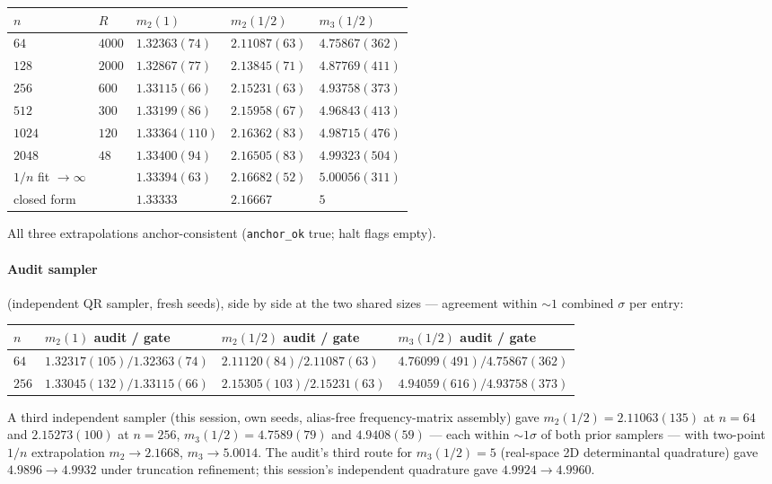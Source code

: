 \documentclass[11pt]{article}
\theoremstyle{plain}
\theoremstyle{definition}
\theoremstyle{remark}
\begin{document}
\begin{table}[h]
\centering
\begin{tabular}{@{}lllll@{}}
\toprule
$n$ & $R$ & $m_2(1)$ & $m_2(1/2)$ & $m_3(1/2)$ \\
\midrule
$64$ & $4000$ & $1.32363(74)$ & $2.11087(63)$ & $4.75867(362)$ \\
$128$ & $2000$ & $1.32867(77)$ & $2.13845(71)$ & $4.87769(411)$ \\
$256$ & $600$ & $1.33115(66)$ & $2.15231(63)$ & $4.93758(373)$ \\
$512$ & $300$ & $1.33199(86)$ & $2.15958(67)$ & $4.96843(413)$ \\
$1024$ & $120$ & $1.33364(110)$ & $2.16362(83)$ & $4.98715(476)$ \\
$2048$ & $48$ & $1.33400(94)$ & $2.16505(83)$ & $4.99323(504)$ \\
\addlinespace
$1/n$ fit $\to \infty$ & & $1.33394(63)$ & $2.16682(52)$ & $5.00056(311)$ \\
closed form & & $1.33333$ & $2.16667$ & $5$ \\
\bottomrule
\end{tabular}
\end{table}

All three extrapolations anchor-consistent (\texttt{anchor\_ok} true; halt flags
empty).

\paragraph{Audit sampler}
(independent QR sampler, fresh seeds), side by side at the two shared sizes ---
agreement within ${\sim}1$ combined $\sigma$ per entry:

\begin{table}[h]
\centering
\begin{tabular}{@{}llll@{}}
\toprule
$n$ & $m_2(1)$ audit / gate & $m_2(1/2)$ audit / gate &
$m_3(1/2)$ audit / gate \\
\midrule
$64$ & $1.32317(105) / 1.32363(74)$ & $2.11120(84) / 2.11087(63)$ &
$4.76099(491) / 4.75867(362)$ \\
$256$ & $1.33045(132) / 1.33115(66)$ & $2.15305(103) / 2.15231(63)$ &
$4.94059(616) / 4.93758(373)$ \\
\bottomrule
\end{tabular}
\end{table}

A third independent sampler (this session, own seeds, alias-free
frequency-matrix assembly) gave $m_2(1/2) = 2.11063(135)$ at $n = 64$ and
$2.15273(100)$ at $n = 256$, $m_3(1/2) = 4.7589(79)$ and $4.9408(59)$ --- each
within ${\sim}1\sigma$ of both prior samplers --- with two-point $1/n$
extrapolation $m_2 \to 2.1668$, $m_3 \to 5.0014$. The audit's third route for
$m_3(1/2) = 5$ (real-space 2D determinantal quadrature) gave
$4.9896 \to 4.9932$ under truncation refinement; this session's independent
quadrature gave $4.9924 \to 4.9960$.
\end{document}
